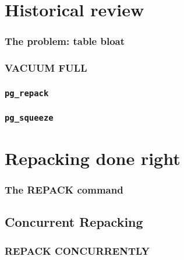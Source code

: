 \section{Historical review}

\begin{frame}
	\frametitle{The problem: table bloat}
\end{frame}

\begin{frame}
	\frametitle{VACUUM FULL}
\end{frame}

\begin{frame}
	\frametitle{\texttt{pg\_repack}}
\end{frame}

\begin{frame}
	\frametitle{\texttt{pg\_squeeze}}
\end{frame}

\section{Repacking done right}
\begin{frame}
	\frametitle{The REPACK command}
\end{frame}

\subsection{Concurrent Repacking}
\begin{frame}
	\frametitle{REPACK CONCURRENTLY}
\end{frame}
